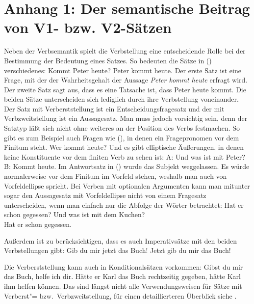 \section{Anhang 1: Der semantische Beitrag von V1- bzw. V2-Sätzen}
\label{sec-semantik-v1-v2}

%

Neben der Verbsemantik spielt die Verbstellung eine entscheidende Rolle bei der
Bestimmung der Bedeutung eines Satzes. So bedeuten die Sätze in () verschiedenes:
\eal
\ex Kommt Peter heute? 
\ex Peter kommt heute.
\zl
Der erste Satz ist eine Frage, mit der der Wahrheitsgehalt der Aussage \emph{Peter kommt heute}
erfragt wird. Der zweite Satz sagt aus, dass es eine Tatsache ist, dass Peter heute kommt. Die beiden
Sätze unterscheiden sich lediglich durch ihre Verbstellung voneinander. Der Satz mit Verberststellung
ist ein Entscheidungsfragesatz und der mit Verbzweitstellung ist ein
Aussagesatz. Man muss jedoch vorsichtig sein, denn der Satztyp läßt sich
nicht ohne weiteres an der Position des Verbs festmachen. So gibt es zum Beispiel auch Fragen wie
(), in denen ein Fragepronomen vor dem Finitum steht.
\ea
Wer kommt heute?
\z
Und es gibt elliptische Äußerungen, in denen keine Konstituente vor dem finiten Verb zu sehen ist:
\ea
A: Und was ist mit Peter?\\
B: Kommt heute.
\z
Im Antwortsatz in () wurde das Subjekt weggelassen. Es würde normalerweise vor dem Finitum im Vorfeld
stehen, weshalb man auch von Vorfeldellipse spricht.
Bei Verben mit optionalen Argumenten kann man mitunter sogar den Aussagesatz mit Vorfeldellipse
nicht von einem Fragesatz unterscheiden, wenn man einfach nur die Abfolge der Wörter betrachtet:
\eal
\label{bsp-hat-er-gegessen}
\ex Hat er schon gegessen?
\ex Und was ist mit dem Kuchen?\\
    Hat er schon gegessen.
\zl

\noindent
Außerdem ist zu berücksichtigen, dass es auch Imperativsätze mit den beiden Verbstellungen gibt:
\eal
\ex Gib du mir jetzt das Buch!
\ex Jetzt gib du mir das Buch!
\zl

\noindent
Die Verberststellung kann auch in Konditionalsätzen vorkommen:
\eal
\ex Gibst du mir das Buch, helfe ich dir.
\ex Hätte er Karl das Buch rechtzeitig gegeben, hätte Karl ihm helfen können.
\zl
Das sind längst nicht alle Verwendungsweisen für Sätze mit Verberst"= bzw.\ Verbzweitstellung,
für einen detaillierteren Überblick siehe .


